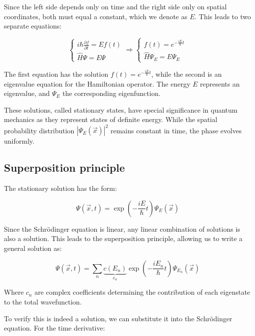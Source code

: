 \documentclass[italian]{HKNdocument}
\begin{document}
Since the left side depends only on time and the right side only on spatial coordinates, both must equal a constant, which we denote as $E$. This leads to two separate equations:

\[
\left\{\begin{array}{l}
i\hbar\frac{\partial f}{\partial t} = Ef(t) \\
\hat{H}\Psi = E\Psi
\end{array}\right. \Rightarrow \left\{\begin{array}{l}
f(t) = e^{-\frac{iE}{\hbar}t} \\
\hat{H}\Psi_E = E\Psi_E
\end{array}\right. \label{eq:2.4}
\]

The first equation has the solution $f(t) = e^{-\frac{iE}{\hbar}t}$, while the second is an eigenvalue equation for the Hamiltonian operator. The energy $E$ represents an eigenvalue, and $\Psi_E$ the corresponding eigenfunction.

These solutions, called stationary states, have special significance in quantum mechanics as they represent states of definite energy. While the spatial probability distribution $|\Psi_E(\vec{x})|^2$ remains constant in time, the phase evolves uniformly.

\subsection{Superposition principle}

The stationary solution has the form:

\begin{equation}
\Psi(\vec{x}, t) = \exp\left(-\frac{iE}{\hbar}t\right)\Psi_E(\vec{x}) \label{eq:2.5}
\end{equation}

Since the Schrödinger equation is linear, any linear combination of solutions is also a solution. This leads to the superposition principle, allowing us to write a general solution as:

\begin{equation}
\Psi(\vec{x}, t) = \sum_n \underbrace{c(E_n)}_{c_n}\exp\left(-\frac{iE_n}{\hbar}t\right)\Psi_{E_n}(\vec{x}) \label{eq:2.6}
\end{equation}

Where $c_n$ are complex coefficients determining the contribution of each eigenstate to the total wavefunction.

To verify this is indeed a solution, we can substitute it into the Schrödinger equation. For the time derivative:
\end{document}
